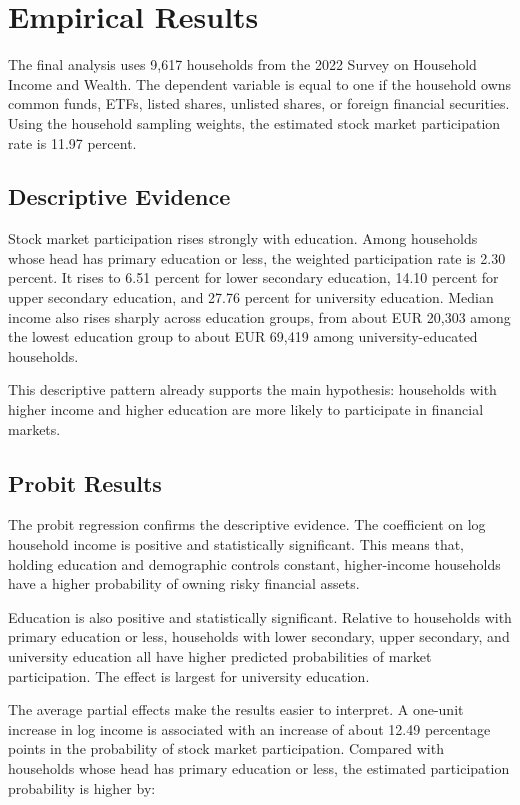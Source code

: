 \section{Empirical Results}

The final analysis uses 9,617 households from the 2022 Survey on Household Income and Wealth. The dependent variable is equal to one if the household owns common funds, ETFs, listed shares, unlisted shares, or foreign financial securities. Using the household sampling weights, the estimated stock market participation rate is 11.97 percent.

\subsection{Descriptive Evidence}

Stock market participation rises strongly with education. Among households whose head has primary education or less, the weighted participation rate is 2.30 percent. It rises to 6.51 percent for lower secondary education, 14.10 percent for upper secondary education, and 27.76 percent for university education. Median income also rises sharply across education groups, from about EUR 20,303 among the lowest education group to about EUR 69,419 among university-educated households.

This descriptive pattern already supports the main hypothesis: households with higher income and higher education are more likely to participate in financial markets.

\subsection{Probit Results}

The probit regression confirms the descriptive evidence. The coefficient on log household income is positive and statistically significant. This means that, holding education and demographic controls constant, higher-income households have a higher probability of owning risky financial assets.

Education is also positive and statistically significant. Relative to households with primary education or less, households with lower secondary, upper secondary, and university education all have higher predicted probabilities of market participation. The effect is largest for university education.

The average partial effects make the results easier to interpret. A one-unit increase in log income is associated with an increase of about 12.49 percentage points in the probability of stock market participation. Compared with households whose head has primary education or less, the estimated participation probability is higher by:

